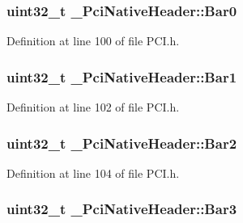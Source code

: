 \subsubsection[{\texorpdfstring{Bar0}{Bar0}}]{\setlength{\rightskip}{0pt plus 5cm}uint32\+\_\+t \+\_\+\+Pci\+Native\+Header\+::\+Bar0}\hypertarget{struct__PciNativeHeader_a5ea1ceacaf1539a1f43d418cb35d5ae0}{}\label{struct__PciNativeHeader_a5ea1ceacaf1539a1f43d418cb35d5ae0}


Definition at line 100 of file P\+C\+I.\+h.

\subsubsection[{\texorpdfstring{Bar1}{Bar1}}]{\setlength{\rightskip}{0pt plus 5cm}uint32\+\_\+t \+\_\+\+Pci\+Native\+Header\+::\+Bar1}\hypertarget{struct__PciNativeHeader_aa9af6e2520f693035c7db1b08532bbac}{}\label{struct__PciNativeHeader_aa9af6e2520f693035c7db1b08532bbac}


Definition at line 102 of file P\+C\+I.\+h.

\subsubsection[{\texorpdfstring{Bar2}{Bar2}}]{\setlength{\rightskip}{0pt plus 5cm}uint32\+\_\+t \+\_\+\+Pci\+Native\+Header\+::\+Bar2}\hypertarget{struct__PciNativeHeader_aefeefb8bb0d4d2c8c9d699b146472abb}{}\label{struct__PciNativeHeader_aefeefb8bb0d4d2c8c9d699b146472abb}


Definition at line 104 of file P\+C\+I.\+h.

\subsubsection[{\texorpdfstring{Bar3}{Bar3}}]{\setlength{\rightskip}{0pt plus 5cm}uint32\+\_\+t \+\_\+\+Pci\+Native\+Header\+::\+Bar3}\hypertarget{struct__PciNativeHeader_a7db6363b61b19d6a52ef679b22f560cb}{}\label{struct__PciNativeHeader_a7db6363b61b19d6a52ef679b22f560cb}


